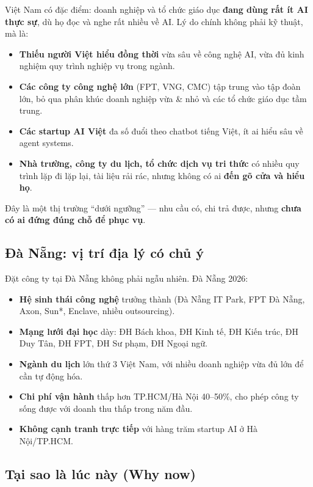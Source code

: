 \documentclass[11pt,a4paper]{article}
\begin{document}
Việt Nam có đặc điểm: doanh nghiệp và tổ chức giáo dục \textbf{đang dùng rất ít
AI thực sự}, dù họ đọc và nghe rất nhiều về AI. Lý do chính không phải kỹ thuật,
mà là:

\begin{itemize}
\item \textbf{Thiếu người Việt hiểu đồng thời} vừa sâu về công nghệ AI, vừa đủ
kinh nghiệm quy trình nghiệp vụ trong ngành.
\item \textbf{Các công ty công nghệ lớn} (FPT, VNG, CMC) tập trung vào tập đoàn
lớn, bỏ qua phân khúc doanh nghiệp vừa \& nhỏ và các tổ chức giáo dục tầm trung.
\item \textbf{Các startup AI Việt} đa số đuổi theo chatbot tiếng Việt, ít ai
hiểu sâu về agent systems.
\item \textbf{Nhà trường, công ty du lịch, tổ chức dịch vụ tri thức} có nhiều
quy trình lặp đi lặp lại, tài liệu rải rác, nhưng không có ai \textbf{đến gõ
cửa và hiểu họ}.
\end{itemize}

Đây là một thị trường ``dưới ngưỡng'' — nhu cầu có, chi trả được, nhưng
\textbf{chưa có ai đứng đúng chỗ để phục vụ}.

\subsection{Đà Nẵng: vị trí địa lý có chủ ý}

Đặt công ty tại Đà Nẵng không phải ngẫu nhiên. Đà Nẵng 2026:
\begin{itemize}
\item \textbf{Hệ sinh thái công nghệ} trưởng thành (Đà Nẵng IT Park, FPT Đà Nẵng,
Axon, Sun*, Enclave, nhiều outsourcing).
\item \textbf{Mạng lưới đại học} dày: ĐH Bách khoa, ĐH Kinh tế, ĐH Kiến trúc, ĐH
Duy Tân, ĐH FPT, ĐH Sư phạm, ĐH Ngoại ngữ.
\item \textbf{Ngành du lịch} lớn thứ 3 Việt Nam, với nhiều doanh nghiệp vừa đủ
lớn để cần tự động hóa.
\item \textbf{Chi phí vận hành} thấp hơn TP.HCM/Hà Nội 40--50\%, cho phép công ty
sống được với doanh thu thấp trong năm đầu.
\item \textbf{Không cạnh tranh trực tiếp} với hàng trăm startup AI ở Hà Nội/TP.HCM.
\end{itemize}

\subsection{Tại sao là lúc này (Why now)}
\end{document}
